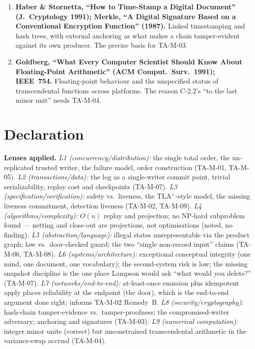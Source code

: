 \documentclass[11pt,a4paper]{article}
\begin{document}
\begin{enumerate}[leftmargin=1.6em,itemsep=2pt]
\item \textbf{Haber \& Stornetta, ``How to Time-Stamp a Digital Document'' (J.\ Cryptology
1991); Merkle, ``A Digital Signature Based on a Conventional Encryption Function'' (1987).}
Linked timestamping and hash trees, with external anchoring as what makes a chain tamper-evident
against its own producer. The precise basis for TA-M-03.

\item \textbf{Goldberg, ``What Every Computer Scientist Should Know About Floating-Point
Arithmetic'' (ACM Comput.\ Surv.\ 1991); IEEE~754.} Floating-point behaviour and the
unspecified status of transcendental functions across platforms. The reason C-2.2's ``to the last
minor unit'' needs TA-M-04.

\end{enumerate}

\section{Declaration}

\textbf{Lenses applied.}
\emph{L1 (concurrency/distribution):} the single total order, the un-replicated trusted writer,
the failure model, order construction (TA-M-01, TA-M-05).
\emph{L2 (transactions/data):} the log as a single-writer commit point, trivial serializability,
replay cost and checkpoints (TA-M-07).
\emph{L3 (specification/verification):} safety vs.\ liveness, the TLA$^{+}$-style model, the
missing liveness commitment, detection liveness (TA-M-02, TA-M-09).
\emph{L4 (algorithms/complexity):} $O(n)$ replay and projection; no NP-hard subproblem found ---
netting and close-out are projections, not optimisations (noted, no finding).
\emph{L5 (abstraction/language):} illegal states unrepresentable via the product graph; law vs.\
door-checked guard; the two ``single non-record input'' claims (TA-M-06, TA-M-08).
\emph{L6 (systems/architecture):} exceptional conceptual integrity (one mind, one document, one
vocabulary); the second-system risk is low; the missing snapshot discipline is the one place
Lampson would ask ``what would you delete?'' (TA-M-07).
\emph{L7 (networks/end-to-end):} at-least-once emission plus idempotent apply places reliability
at the endpoint (the door), which is the end-to-end argument done right; informs TA-M-02
Remedy~B.
\emph{L8 (security/cryptography):} hash-chain tamper-evidence vs.\ tamper-proofness; the
compromised-writer adversary; anchoring and signatures (TA-M-03).
\emph{L9 (numerical computation):} integer minor units (correct) but unconstrained transcendental
arithmetic in the variance-swap accrual (TA-M-04).
\end{document}
